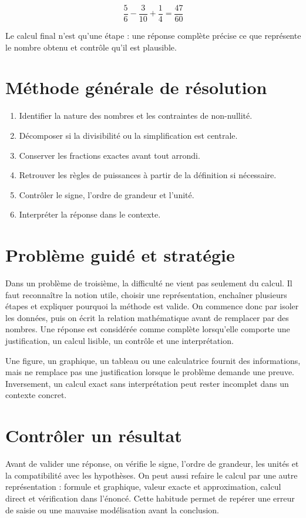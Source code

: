\[
\dfrac56-\dfrac3{10}+\dfrac14=\dfrac{47}{60}
\]

\begin{exemple}
Le calcul final n’est qu’une étape : une réponse complète précise ce que représente le nombre obtenu et contrôle qu’il est plausible.
\end{exemple}

\section{Méthode générale de résolution}
\begin{methode}
\begin{enumerate}
\item Identifier la nature des nombres et les contraintes de non-nullité.
\item Décomposer si la divisibilité ou la simplification est centrale.
\item Conserver les fractions exactes avant tout arrondi.
\item Retrouver les règles de puissances à partir de la définition si nécessaire.
\item Contrôler le signe, l’ordre de grandeur et l’unité.
\item Interpréter la réponse dans le contexte.
\end{enumerate}
\end{methode}

\section{Problème guidé et stratégie}
Dans un problème de troisième, la difficulté ne vient pas seulement du calcul. Il faut reconnaître la notion utile, choisir une représentation, enchaîner plusieurs étapes et expliquer pourquoi la méthode est valide. On commence donc par isoler les données, puis on écrit la relation mathématique avant de remplacer par des nombres. Une réponse est considérée comme complète lorsqu’elle comporte une justification, un calcul lisible, un contrôle et une interprétation.

\begin{attention}
Une figure, un graphique, un tableau ou une calculatrice fournit des informations, mais ne remplace pas une justification lorsque le problème demande une preuve. Inversement, un calcul exact sans interprétation peut rester incomplet dans un contexte concret.
\end{attention}

\section{Contrôler un résultat}
Avant de valider une réponse, on vérifie le signe, l’ordre de grandeur, les unités et la compatibilité avec les hypothèses. On peut aussi refaire le calcul par une autre représentation : formule et graphique, valeur exacte et approximation, calcul direct et vérification dans l’énoncé. Cette habitude permet de repérer une erreur de saisie ou une mauvaise modélisation avant la conclusion.


